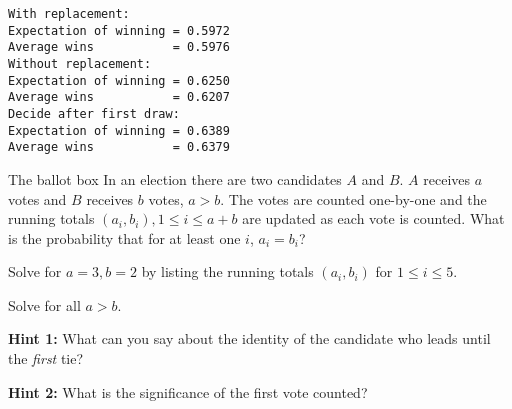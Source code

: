\sml{}
\begin{verbatim}
With replacement:
Expectation of winning = 0.5972
Average wins           = 0.5976
Without replacement:
Expectation of winning = 0.6250
Average wins           = 0.6207
Decide after first draw:
Expectation of winning = 0.6389
Average wins           = 0.6379
\end{verbatim}



\begin{prob}{The ballot box}
In an election there are two candidates $A$ and $B$.  $A$ receives $a$ votes and $B$ receives $b$ votes, $a>b$. The votes are counted one-by-one and the running totals $(a_i,b_i), 1\leq i \leq a+b$ are updated as each vote is counted. What is the probability that for at least one $i$, $a_i=b_i$?

 Solve for $a=3, b=2$ by listing the running totals $(a_i,b_i)$ for $1\leq i\leq 5$.

 Solve for all $a>b$.

\textbf{Hint 1:} What can you say about the identity of the candidate who leads until the \emph{first} tie?

\textbf{Hint 2:} What is the significance of the first vote counted?
\end{prob}

\solution{}

